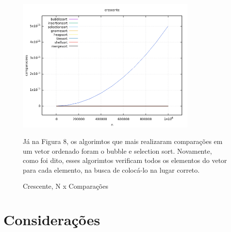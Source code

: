 \documentclass[report]{uftex}
\begin{document}
\begin{figure}[h]
\centering
\caption{Crescente, N x Comparações}
\includegraphics[width=0.8\textwidth]{graphs/crescente-comparações.png}

Já na Figura 8, os algorimtos que mais realizaram comparações em um vetor ordenado foram o bubble e selection sort. Novamente, como foi dito, esses algorimtos verificam todos os elementos do vetor para cada elemento, na busca de colocá-lo na lugar correto.

\end{figure}

\section{Considerações}

\backmatter 
\singlespacing   


\appendix
\onehalfspacing
\end{document}
